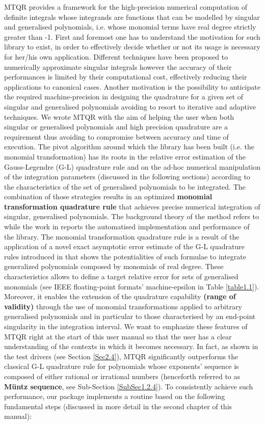 \documentclass[a4paper, twosided]{book}
\begin{document}
\noindent
MTQR provides a framework for the high-precision numerical computation of definite integrals whose integrands are functions that can be modelled by singular and generalised polynomials, i.e. whose monomial terms have real degree strictly greater than -1. First and foremost one has to understand the motivation for such library to exist, in order to effectively decide whether or not its usage is necessary for her/his own application. Different techniques have been proposed to numerically approximate singular integrals however the accuracy of their performances is limited by their computational cost, effectively reducing their applications to canonical cases. Another motivation is the possibility to anticipate the required machine-precision in designing the quadrature for a given set of singular and generalised polynomials avoiding to resort to iterative and adaptive techniques. We wrote MTQR with the aim of helping the user when both singular or generalised polynomials and high precision quadrature are a requirement thus avoiding to compromise between accuracy and time of execution. The pivot algorithm around which the library has been built (i.e. the monomial transformation) has its roots in the relative error estimation of the Gauss-Legendre (G-L) quadrature rule and on the ad-hoc numerical manipulation of the integration parameters (discussed in the following sections) according to the characteristics of the set of generalised polynomials to be integrated. The combination of those strategies results in an optimized \color{poliDarkBlue} \textbf{monomial transformation quadrature rule} \color{black} that achieves precise numerical integration of singular, generalised polynomials. The background theory of the method refers to \cite{Lombardi09} while the work in \cite{Lombardi21} reports the automatised implementation and performance of the library. The monomial transformation quadrature rule is a result of the application of a novel exact asymptotic error estimate of the G-L quadrature rules introduced in \cite{Lombardi09} that shows the potentialities of such formulae to integrate generalized polynomials composed by monomials of real degree. These characteristics allows to define a  target relative error for sets of generalised monomials (see IEEE floating-point formats' machine-epsilon in Table \ref{table1.1}). Moreover, it enables the extension of the quadrature capability  \color{poliDarkBlue} \textbf{(range of validity)} \color{black} through the use of monomial transformations applied to arbitrary generalised polynomials and in particular to those characterised by an end-point singularity in the integration interval. We want to emphasize these features of MTQR right at the start of this user manual so that the user has a clear understanding of the contexts in which it becomes necessary. In fact, as shown in the test drivers (see Section \ref{Sec2.4}), MTQR significantly outperforms the classical G-L quadrature rule for polynomials whose exponents' sequence is composed of either rational or irrational numbers (henceforth referred to as \color{poliDarkBlue} \textbf{Müntz sequence}\color{black}, see Sub-Section \ref{SubSec1.2.4}). To consistently achieve such performance, our package implements a routine based on the following fundamental steps (discussed in more detail in the second chapter of this manual):
\end{document}
